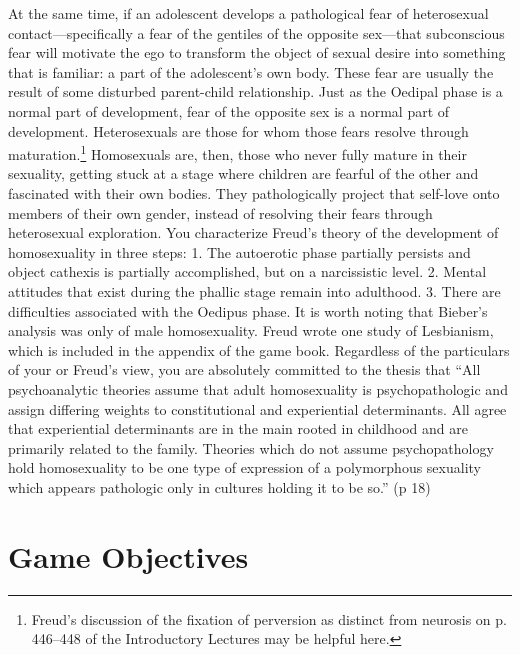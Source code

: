 At the same time, if an adolescent develops a pathological fear of heterosexual contact—specifically a fear of the gentiles of the opposite sex—that subconscious fear will motivate the ego to transform the object of sexual desire into something that is familiar: a part of the adolescent's own body. These fear are usually the result of some disturbed parent-child relationship. Just as the Oedipal phase is a normal part of development, fear of the opposite sex is a normal part of development. Heterosexuals are those for whom those fears resolve through maturation.\footnote{Freud's discussion of the fixation of perversion as distinct from neurosis on p. 446--448 of the Introductory Lectures may be helpful here.}
Homosexuals are, then, those who never fully mature in their sexuality, getting stuck at a stage where children are fearful of the other and fascinated with their own bodies. They pathologically project that self-love onto members of their own gender, instead of resolving their fears through heterosexual exploration.
You characterize Freud's theory of the development of homosexuality in three steps:
1. The autoerotic phase partially persists and object cathexis is partially accomplished, but on a narcissistic level.
2. Mental attitudes that exist during the phallic stage remain into adulthood.
3. There are difficulties associated with the Oedipus phase.
It is worth noting that Bieber's analysis was only of male homosexuality. Freud wrote one study of Lesbianism, which is included in the appendix of the game book.
Regardless of the particulars of your or Freud's view, you are absolutely committed to the thesis that
“All psychoanalytic theories assume that adult homosexuality is psychopathologic and assign differing weights to constitutional and experiential determinants. All agree that experiential determinants are in the main rooted in childhood and are primarily related to the family. Theories which do not assume psychopathology hold homosexuality to be one type of expression of a polymorphous sexuality which appears pathologic only in cultures holding it to be so.” (p 18)

\section{Game Objectives}
\label{gameobjectives}

